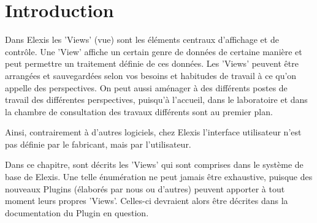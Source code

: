 %

\section{Introduction}
Dans Elexis les 'Views' (vue) sont les éléments centraux d'affichage et de contrôle.
Une 'View' affiche un certain genre de données de certaine manière et peut permettre un traitement définie de ces données. Les 'Views' peuvent être arrangées et sauvegardées selon vos besoins et habitudes de travail à ce qu'on appelle des perspectives. On peut aussi aménager à des différents postes de travail des différentes perspectives, puisqu'à l'accueil, dans le laboratoire et dans la chambre de consultation des travaux différents sont au premier plan.


Ainsi, contrairement à d'autres logiciels, chez Elexis l'interface utilisateur n'est pas définie par le fabricant, mais par l'utilisateur.

Dans ce chapitre, sont décrits les 'Views' qui sont comprises dans le système de base de Elexis.
Une telle énumération ne peut jamais être exhaustive, puisque des nouveaux Plugins (élaborés par nous ou d'autres) peuvent apporter à tout moment leurs propres 'Views'.
Celles-ci devraient alors être décrites dans la documentation du Plugin en question.


